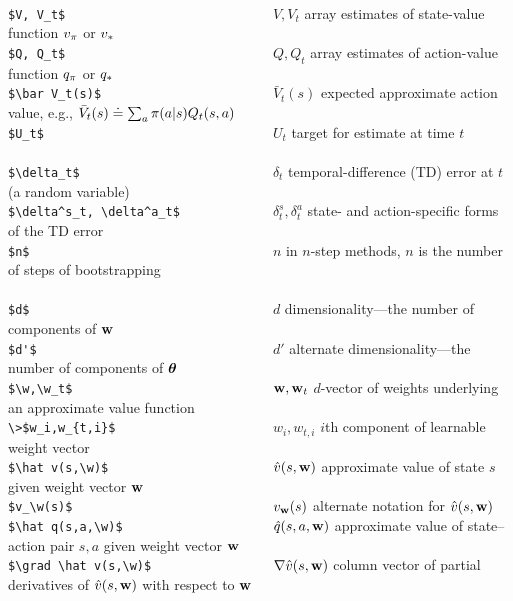 \documentclass[10pt,fleqn]{article}
\begin{document}
\begin{tabbing}
\\
\>\verb+$V, V_t$                             +\>$V, V_t$            \> array estimates of state-value function $v_\pi$ or $v_*$\\
\>\verb+$Q, Q_t$                             +\>$Q, Q_t$            \> array estimates of action-value function $q_\pi$ or $q_*$\\
\>\verb+$\bar V_t(s)$                        +\>$\bar V_t(s)$       \> expected approximate action value, e.g., $\bar V_t(s)\doteq\sum_a\pi(a|s)Q_{t}(s,a)$\\
\>\verb+$U_t$                                +\>$U_t$               \> target for estimate at time $t$\\
\\
\>\verb+$\delta_t$                           +\>$\delta_t$          \> temporal-difference (TD) error at $t$ (a random variable) \\
\>\verb#$\delta^s_t, \delta^a_t$             #\>$\delta^s_t, \delta^a_t$ \> state- and action-specific forms of the TD error \\
\>\verb+$n$                                  +\>$n$                 \> in $n$-step methods, $n$ is the number of steps of bootstrapping\\
\\
\>\verb+$d$                                  +\>$d$                 \> dimensionality---the number of components of ${\bf w}$\\
\>\verb+$d'$                                 +\>$d'$                \> alternate dimensionality---the number of components of ${\bm\theta}$\\
\>\verb+$\w,\w_t$                            +\>${\bf w},{\bf w}_t$           \> $d$-vector of weights underlying an approximate value function\\
\>\verb#\>$w_i,w_{t,i}$                      #\>$w_i,w_{t,i}$       \> $i$th component of learnable weight vector\\
\>\verb+$\hat v(s,\w)$                       +\>$\hat v(s,{\bf w})$      \> approximate value of state $s$ given weight vector ${\bf w}$\\
\>\verb+$v_\w(s)$                            +\>$v_{\bf w}(s)$           \> alternate notation for $\hat v(s,{\bf w})$\\
\>\verb#$\hat q(s,a,\w)$                     #\>$\hat q(s,a,{\bf w})$    \> approximate value of state--action pair $s,a$ given weight vector ${\bf w}$\\
\>\verb#$\grad \hat v(s,\w)$                 #\>$\nabla \hat v(s,{\bf w})$\> column vector of partial derivatives of $\hat v(s,{\bf w})$ with respect to ${\bf w}$\\

\end{tabbing}
\end{document}
